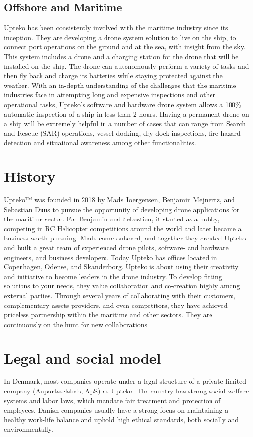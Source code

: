 \subsection{Offshore and Maritime}
Upteko has been consistently involved with the maritime industry since its inception. They are developing a drone system solution to live on the ship, to connect port operations on the ground and at the sea, with insight from the sky. This system includes a drone and a charging station for the drone that will be installed on the ship. The drone can autonomously perform a variety of tasks and then fly back and charge its batteries while staying protected against the weather. 
With an in-depth understanding of the challenges that the maritime industries face in attempting long and expensive inspections and other operational tasks, Upteko's software and hardware drone system allows a 100\% automatic inspection of a ship in less than 2 hours. 
Having a permanent drone on a ship will be extremely helpful in a number of cases that can range from Search and Rescue (SAR) operations, vessel docking, dry dock inspections, fire hazard detection and situational awareness among other functionalities.

\section{History}
Upteko™ was founded in 2018 by Mads Joergensen, Benjamin Mejnertz, and Sebastian Duus to pursue the opportunity of developing drone applications for the maritime sector. For Benjamin and Sebastian, it started as a hobby, competing in RC Helicopter competitions around the world and later became a business worth pursuing. Mads came onboard, and together they created Upteko and built a great team of experienced drone pilots, software- and hardware engineers, and business developers. Today Upteko has offices located in Copenhagen, Odense, and Skanderborg. Upteko is about using their creativity and initiative to become leaders in the drone industry.
To develop fitting solutions to your needs, they value collaboration and co-creation highly among external parties. Through several years of collaborating with their customers, complementary assets providers, and even competitors, they have achieved priceless partnership within the maritime and other sectors. They are continuously on the hunt for new collaborations.

\section{Legal and social model}
In Denmark, most companies operate under a legal structure of a private limited company (Anpartsselskab, ApS) as Upteko. The country has strong social welfare systems and labor laws, which mandate fair treatment and protection of employees. Danish companies usually have a strong focus on maintaining a healthy work-life balance and uphold high ethical standards, both socially and environmentally.

